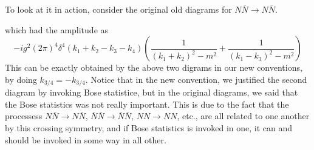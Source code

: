 \documentclass[11pt, notitlepage]{report}
\numberwithin{equation}{section}
\begin{document}
    To look at it in action, consider the original old diagrams for \(N\bar{N} \to N \bar N\).
    \begin{figure}[h]
        \centering
    \end{figure}
    which had the amplitude as
    \begin{equation*}
        -ig^2(2\pi)^4\delta^4(k_1 + k_2 - k_3 - k_4) \left(  \frac{1}{(k_1 + k_2)^2 - m^2} +    \frac{1}{(k_1 
    - k_3)^2 - m^2}    \right)
    \end{equation*}
    This can be exactly obtained by the above two digrams in our new conventions, by doing \(k_{3/4} = -k_{3/4}\). Notice that in the new convention, we justified the second diagram by invoking Bose statistice, but in the original diagrams, we said that the Bose statistics was not really important. This is due to the fact that the processess \(N\bar{N}\to N\bar N\),  \(\bar N\bar{N}\to \bar N\bar N\), \(NN\to NN\), etc., are all related to one another by this crossing symmetry, and if Bose statistics is invoked in one, it can and should be invoked in some way in all other.\\
\end{document}
